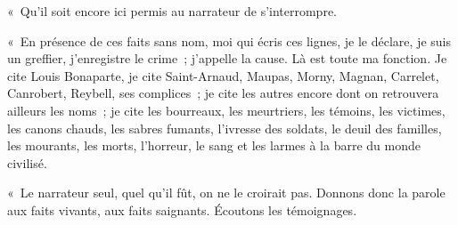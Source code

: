 \documentclass[french,twoside]{book} %
\begin{document}
« Qu’il soit encore ici permis au narrateur de s’interrompre.\par
« En présence de ces faits sans nom, moi qui écris ces lignes, je le déclare, je suis un greffier, j’enregistre le crime ; j’appelle la cause. Là est toute ma fonction. Je cite Louis Bonaparte, je cite Saint-Arnaud, Maupas, Morny, Magnan, Carrelet, Canrobert, Reybell, ses complices ; je cite les autres encore dont on retrouvera ailleurs les noms ; je cite les bourreaux, les meurtriers, les témoins, les victimes, les canons chauds, les sabres fumants, l’ivresse des soldats, le deuil des familles, les mourants, les morts, l’horreur, le sang et les larmes à la barre du monde civilisé.\par
« Le narrateur seul, quel qu’il fût, on ne le croirait pas. Donnons donc la parole aux faits vivants, aux faits saignants. Écoutons les témoignages.
\end{document}

